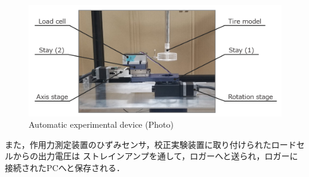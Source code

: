 \begin{figure}[htbp]
    \footnotesize
    \begin{center}
        \includegraphics[width=120mm]{images/21-2.png}
        \caption{Automatic experimental device (Photo)}
    \end{center}
\end{figure}

また，作用力測定装置のひずみセンサ，校正実験装置に取り付けられたロードセルからの出力電圧は
ストレインアンプを通して，ロガーへと送られ，ロガーに接続されたPCへと保存される．